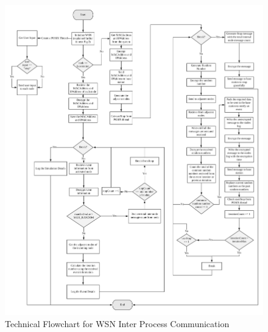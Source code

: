 \documentclass[conference]{IEEEtran}
\begin{document}
	
	\begin{figure}[!ht]
		\centering
		\includegraphics[width=6.5in]{arc}
		\caption{Technical Flowchart for WSN Inter Process Communication}
		\label{arc}
	\end{figure}
		
\end{document}

